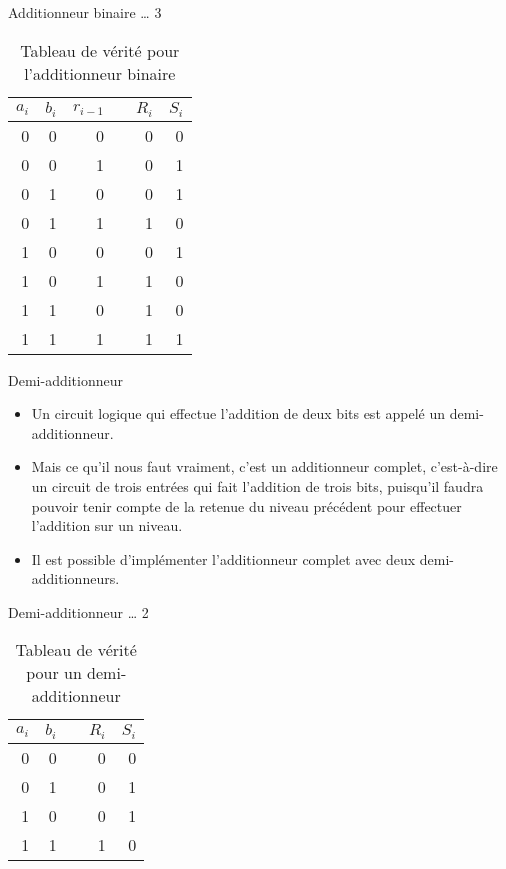 \documentclass[presentation]{beamer}
\begin{document}
\begin{frame}[label={sec:orgc62f9ca}]{Additionneur binaire \ldots{} 3}
\begin{table}[htbp]
\caption{\label{tab:orgabd2521}Tableau de vérité pour l'additionneur binaire}
\centering
\begin{tabular}{rrrlrr}
\(a_{i}\) & \(b_{i}\) & \(r_{i-1}\) &  & \(R_{i}\) & \(S_{i}\)\\
\hline
0 & 0 & 0 &  & 0 & 0\\
0 & 0 & 1 &  & 0 & 1\\
0 & 1 & 0 &  & 0 & 1\\
0 & 1 & 1 &  & 1 & 0\\
1 & 0 & 0 &  & 0 & 1\\
1 & 0 & 1 &  & 1 & 0\\
1 & 1 & 0 &  & 1 & 0\\
1 & 1 & 1 &  & 1 & 1\\
\end{tabular}
\end{table}
\end{frame}


\begin{frame}[label={sec:org47e8b23}]{Demi-additionneur}
\begin{itemize}
\item Un circuit logique qui effectue l'addition de deux bits est appelé un demi-additionneur.

\item Mais ce qu'il nous faut vraiment, c'est un \alert{additionneur complet}, c'est-à-dire un circuit de trois entrées qui fait l'addition de trois bits, puisqu'il faudra pouvoir tenir compte de la retenue du niveau précédent pour effectuer l'addition sur un niveau.

\item Il est possible d'implémenter l'additionneur complet avec deux demi-additionneurs.
\end{itemize}
\end{frame}

\begin{frame}[label={sec:orgcf82464}]{Demi-additionneur \ldots{} 2}
\begin{table}[htbp]
\caption{\label{tab:org844d456}Tableau de vérité pour un demi-additionneur}
\centering
\begin{tabular}{rrlrr}
\(a_{i}\) & \(b_{i}\) &  & \(R_{i}\) & \(S_{i}\)\\
\hline
0 & 0 &  & 0 & 0\\
0 & 1 &  & 0 & 1\\
1 & 0 &  & 0 & 1\\
1 & 1 &  & 1 & 0\\
\end{tabular}
\end{table}
\end{frame}
\end{document}
